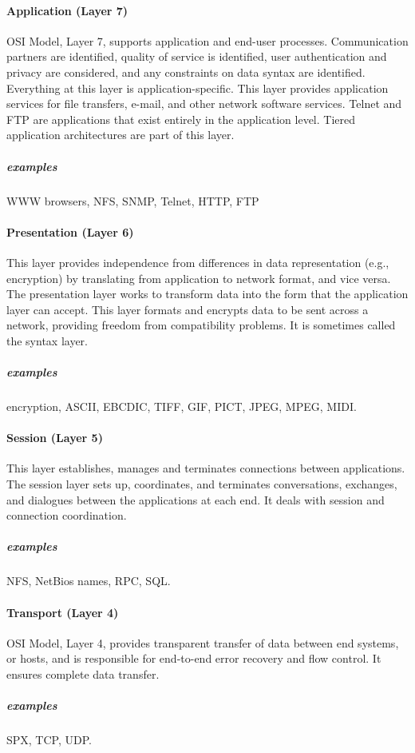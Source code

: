 \documentclass{article}[12pt]
\begin{document}
\paragraph{Application (Layer 7)}

OSI Model, Layer 7, supports application and end-user processes.
Communication partners are identified, quality of service is identified, user authentication and privacy are considered, and any constraints on data syntax are identified.
Everything at this layer is application-specific.
This layer provides application services for file transfers, e-mail, and other network software services.
Telnet and FTP are applications that exist entirely in the application level.
Tiered application architectures are part of this layer.

\subparagraph{examples} WWW browsers, NFS, SNMP, Telnet, HTTP, FTP


\paragraph{Presentation (Layer 6)}
This layer provides independence from differences in data representation (e.g., encryption) by translating from application to network format, and vice versa.
The presentation layer works to transform data into the form that the application layer can accept.
This layer formats and encrypts data to be sent across a network, providing freedom from compatibility problems.
It is sometimes called the syntax layer.

\subparagraph{examples} encryption, ASCII, EBCDIC, TIFF, GIF, PICT, JPEG, MPEG, MIDI.



\paragraph{Session (Layer 5)}
This layer establishes, manages and terminates connections between applications.
The session layer sets up, coordinates, and terminates conversations, exchanges, and dialogues between the applications at each end.
It deals with session and connection coordination.

\subparagraph{examples} NFS, NetBios names, RPC, SQL.



\paragraph{Transport (Layer 4)}
OSI Model, Layer 4, provides transparent transfer of data between end systems, or hosts, and is responsible for end-to-end error recovery and flow control.
It ensures complete data transfer.
\subparagraph{examples} SPX, TCP, UDP.
\end{document}

